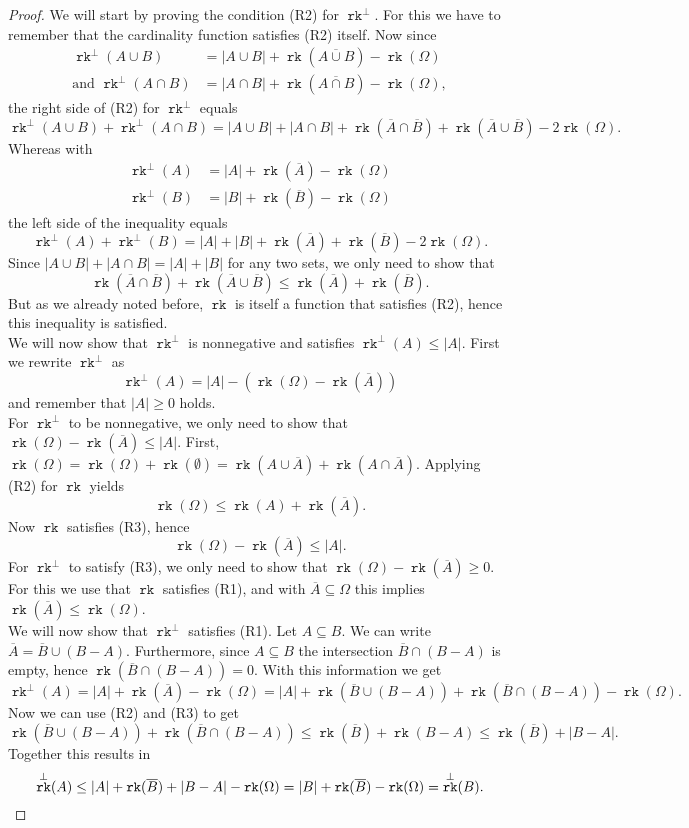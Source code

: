 \documentclass[12pt,a4paper, twoside, autooneside=false]{scrartcl}
\theoremstyle{definition}
\theoremstyle{remark}
\numberwithin{equation}{section}
\DeclareMathOperator{\rk}{\mathtt{rk}}
\begin{document}
\begin{proof}
We will start by proving the condition (R2) for $\rk^\perp$. For this we have to remember that the cardinality function satisfies (R2) itself. Now since 
\begin{align*}
\rk^\perp(A \cup B) &= |A \cup B| + \rk(\overline{A \cup B}) - \rk(\Omega) \\ \text{and } \rk^\perp(A \cap B) &= |A \cap B| + \rk(\overline{A \cap B}) - \rk(\Omega),
\end{align*}
the right side of (R2) for $\rk^\perp$ equals
\[
\rk^\perp(A \cup B) + \rk^\perp(A \cap B) = |A \cup B| + |A \cap B| + \rk(\overline{A} \cap \overline{B}) + \rk(\overline{A} \cup \overline{B}) - 2\rk(\Omega).
\]
Whereas with 
\begin{align*}
\rk^\perp(A) &= |A| + \rk(\overline{A}) - \rk(\Omega)\\
\rk^\perp(B) &= |B| + \rk(\overline{B}) - \rk(\Omega)
\end{align*}
the left side of the inequality equals 
\[
\rk^\perp(A) + \rk^\perp(B) = |A| + |B| + \rk(\overline{A}) + \rk(\overline{B}) - 2\rk(\Omega).
\]
Since $|A \cup B| + |A \cap B| = |A| + |B|$ for any two sets, we only need to show that 
\[
\rk(\overline{A} \cap \overline{B}) + \rk(\overline{A} \cup \overline{B}) \leq \rk(\overline{A}) + \rk(\overline{B}).
\]
But as we already noted before, $\rk$ is itself a function that satisfies (R2), hence this inequality is satisfied. \\
\indent
We will now show that $\rk^\perp$ is nonnegative and satisfies $\rk^\perp(A) \leq |A|$. First we rewrite $\rk^\perp$ as 
\[
\rk^\perp(A) = |A| - (\rk(\Omega) - \rk(\overline{A}))
\]
and remember that $|A| \geq 0$ holds.\\ 
For $\rk^\perp$ to be nonnegative, we only need to show that $\rk(\Omega) - \rk(\overline{A}) \leq |A|$. First, $\rk(\Omega) = \rk(\Omega) + \rk(\emptyset) = \rk(A \cup \overline{A}) + \rk(A \cap \overline{A})$. Applying (R2) for $\rk$ yields
\[
\rk(\Omega) \leq \rk(A) + \rk(\overline{A}).
\]
Now $\rk$ satisfies (R3), hence 
\[
\rk(\Omega) - \rk(\overline{A}) \leq |A|.
\]
For $\rk^\perp$ to satisfy (R3), we only need to show that $\rk(\Omega) - \rk(\overline{A}) \geq 0$. For this we use that $\rk$ satisfies (R1), and with $\overline{A} \subseteq \Omega$ this implies $\rk(\overline{A}) \leq \rk(\Omega)$. \\ 
We will now show that $\rk^\perp$ satisfies (R1). Let $A \subseteq B$. We can write $\overline{A} = \overline{B} \cup (B - A)$. Furthermore, since $A \subseteq B$ the intersection $\overline{B} \cap (B - A)$ is empty, hence $\rk(\overline{B} \cap (B - A)) = 0$. With this information we get 
\[
\rk^\perp(A) = |A| + \rk(\overline{A}) - \rk(\Omega) = |A| + \rk(\overline{B} \cup (B - A)) + \rk(\overline{B} \cap (B - A)) - \rk(\Omega).
\]
Now we can use (R2) and (R3) to get \[
\rk(\overline{B} \cup (B - A)) + \rk(\overline{B} \cap (B - A)) \leq \rk(\overline{B}) + \rk(B - A) \leq \rk(\overline{B}) + |B - A|. 
\]
Together this results in
\[
\rk^\perp(A) \leq |A| + \rk(\overline{B}) + |B - A| - \rk(\Omega) = |B| + \rk(\overline{B}) - \rk(\Omega) = \rk^\perp(B). \qedhere
\]
\end{proof}
\end{document}
